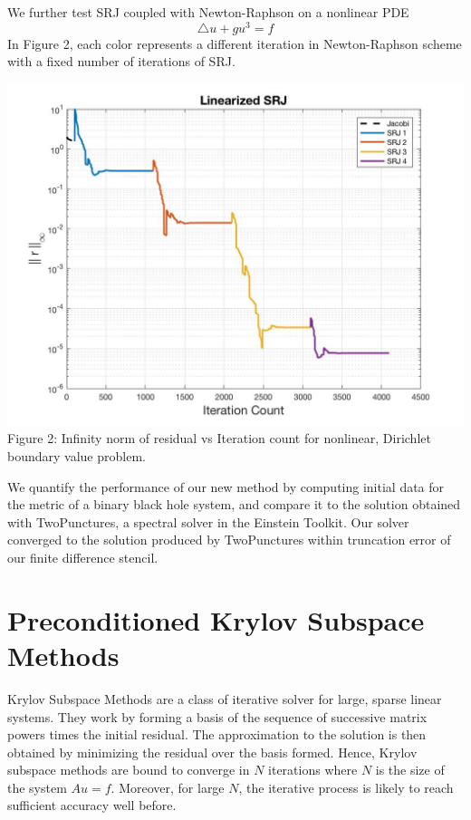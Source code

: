 \documentclass[12pt]{article}
\begin{document}
\begin{multicols}{2}
We further test SRJ coupled with Newton-Raphson on a nonlinear PDE
\begin{equation}
    \triangle u +gu^3 = f
\end{equation}
In Figure 2, each color represents a different iteration in Newton-Raphson scheme with a fixed number of iterations of SRJ.
\begin{center}
    \includegraphics[scale=0.2]{SRJ.jpg} \\
    \small{Figure 2: Infinity norm of residual vs Iteration count for nonlinear, Dirichlet boundary value problem.}
\end{center}

We quantify the performance of our new method by computing initial data for the metric of a binary black hole system, and compare it to the solution obtained with TwoPunctures, a spectral solver in the Einstein Toolkit. Our solver converged to the solution produced by TwoPunctures within truncation error of our finite difference stencil.



\section{Preconditioned Krylov Subspace Methods}
Krylov Subspace Methods are a class of iterative solver for large, sparse linear systems. They work by forming a basis of the sequence of successive matrix powers times the initial residual. The approximation to the solution is then obtained by minimizing the residual over the basis formed. Hence, Krylov subspace methods are bound to converge in $N$ iterations where $N$ is the size of the system $Au=f.$ Moreover, for large $N$, the iterative process is likely to reach sufficient accuracy well before.


\end{multicols}
\end{document}
